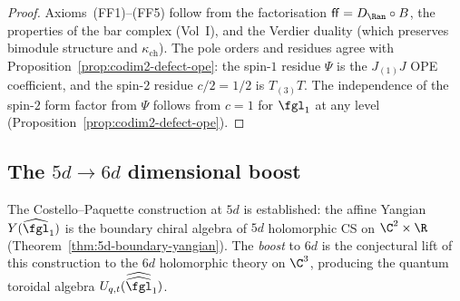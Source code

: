 \begin{proof}
Axioms~(FF1)--(FF5) follow from the factorisation $\mathsf{ff} = D_{\Ran} \circ B$, the properties of the bar complex (Vol~I), and the Verdier duality (which preserves bimodule structure and $\kappa_{\mathrm{ch}}$). The pole orders and residues agree with Proposition~\ref{prop:codim2-defect-ope}: the spin-$1$ residue $\Psi$ is the $J_{(1)}J$ OPE coefficient, and the spin-$2$ residue $c/2 = 1/2$ is $T_{(3)}T$. The independence of the spin-$2$ form factor from $\Psi$ follows from $c = 1$ for $\fgl_1$ at any level (Proposition~\ref{prop:codim2-defect-ope}).
\end{proof}

\subsection{The \texorpdfstring{$5d \to 6d$}{5d -> 6d} dimensional boost}
\label{subsec:cp-5d-to-6d-boost}

The Costello--Paquette construction at $5d$ is established: the affine Yangian $Y(\widehat{\fgl}_1)$ is the boundary chiral algebra of $5d$ holomorphic CS on $\C^2 \times \R$ (Theorem~\ref{thm:5d-boundary-yangian}). The \emph{boost} to $6d$ is the conjectural lift of this construction to the $6d$ holomorphic theory on $\C^3$, producing the quantum toroidal algebra $U_{q,t}(\widehat{\widehat{\fgl}}_1)$.


